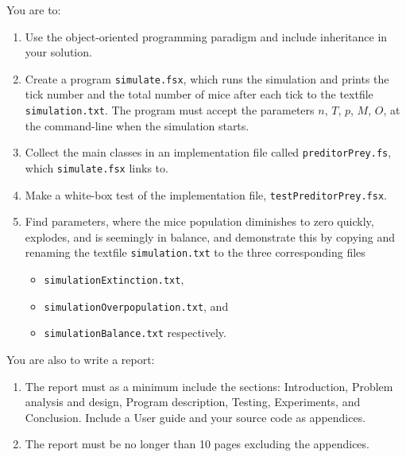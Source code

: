 You are to:
\begin{enumerate}
\item Use the object-oriented programming paradigm and include inheritance in your solution.
\item Create a program \lstinline[language=console]{simulate.fsx}, which runs the simulation and prints the tick number and the total number of mice after each tick to the textfile \lstinline[language=console]{simulation.txt}. The program must accept the parameters $n$, $T$, $p$, $M$, $O$, at the command-line when the simulation starts.
\item Collect the main classes in an implementation file called \lstinline[language=console]{preditorPrey.fs}, which \lstinline[language=console]{simulate.fsx} links to.
\item Make a white-box test of the implementation file, \lstinline[language=console]{testPreditorPrey.fsx}.
\item Find parameters, where the mice population diminishes to zero quickly, explodes, and is seemingly in balance, and demonstrate this by copying and renaming the textfile \lstinline[language=console]{simulation.txt} to the three corresponding files
  \begin{itemize}
  \item \lstinline[language=console]{simulationExtinction.txt},
  \item \lstinline[language=console]{simulationOverpopulation.txt}, and
  \item \lstinline[language=console]{simulationBalance.txt} respectively.
  \end{itemize}
\end{enumerate}
You are also to write a report:
\begin{enumerate}[resume]
\item The report must as a minimum include
  the sections: Introduction, Problem analysis and design, Program
  description, Testing, Experiments, and Conclusion. Include a User
  guide and your source code as appendices.
\item The report must be
  no longer than 10 pages excluding the appendices.
\end{enumerate}
